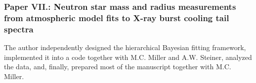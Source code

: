 \subsubsection*{Paper VII.: Neutron star mass and radius measurements from atmospheric model fits to X-ray burst cooling tail spectra}
The author independently designed the hierarchical Bayesian fitting framework, implemented it into a code together with M.C. Miller and A.W. Steiner, analyzed the data, and, finally, prepared most of the manuscript together with M.C. Miller.



